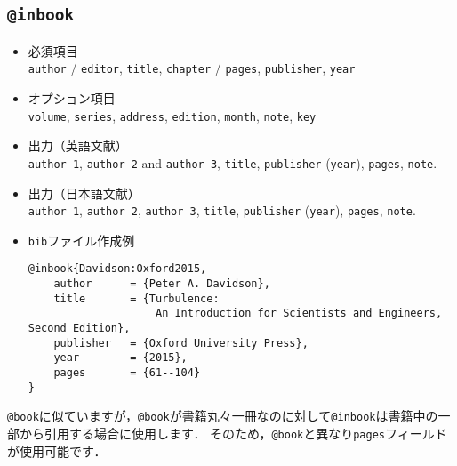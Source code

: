 \documentclass[a4paper,fleqn,uplatex,dvipdfmx]{jsarticle}
\makeatletter
\newcommand{\ttbook}{\texttt{@book}}
\newcommand{\ttinbook}{\texttt{@inbook}}
\makeatother
\begin{document}
\subsection{\ttinbook}
\label{ssec:inbook}
\begin{screen}
    \begin{itemize}
        \item 必須項目 \\
        \verb|author| / \verb|editor|, \verb|title|, \verb|chapter| / \verb|pages|, \verb|publisher|, \verb|year|
        \item オプション項目 \\
        \verb|volume|, \verb|series|, \verb|address|, \verb|edition|, \verb|month|, \verb|note|, \verb|key|
        \item 出力（英語文献） \\
            \colorbox[gray]{0.8}{\texttt{author 1}}, \colorbox[gray]{0.8}{\texttt{author 2}} and \colorbox[gray]{0.8}{\texttt{author 3}}, \colorbox[gray]{0.8}{\texttt{title}}, \colorbox[gray]{0.8}{\texttt{publisher}} (\colorbox[gray]{0.8}{\texttt{year}}), \colorbox[gray]{0.8}{\texttt{pages}}, \colorbox[gray]{0.8}{\texttt{note}}.
        \item 出力（日本語文献） \\
            \colorbox[gray]{0.8}{\texttt{author 1}}, \colorbox[gray]{0.8}{\texttt{author 2}}, \colorbox[gray]{0.8}{\texttt{author 3}}, \colorbox[gray]{0.8}{\texttt{title}}, \colorbox[gray]{0.8}{\texttt{publisher}} (\colorbox[gray]{0.8}{\texttt{year}}), \colorbox[gray]{0.8}{\texttt{pages}}, \colorbox[gray]{0.8}{\texttt{note}}.
        \item \verb|bib|ファイル作成例 \vspace{-3mm}
\begin{verbatim}
@inbook{Davidson:Oxford2015,
    author      = {Peter A. Davidson},
    title       = {Turbulence: 
                    An Introduction for Scientists and Engineers, Second Edition},
    publisher   = {Oxford University Press},
    year        = {2015},
    pages       = {61--104}
}
\end{verbatim}
    \end{itemize}
\end{screen}

\ttbook に似ていますが，\ttbook が書籍丸々一冊なのに対して\ttinbook は書籍中の一部から引用する場合に使用します．
そのため，\ttbook と異なり\verb|pages|フィールドが使用可能です．
\end{document}
